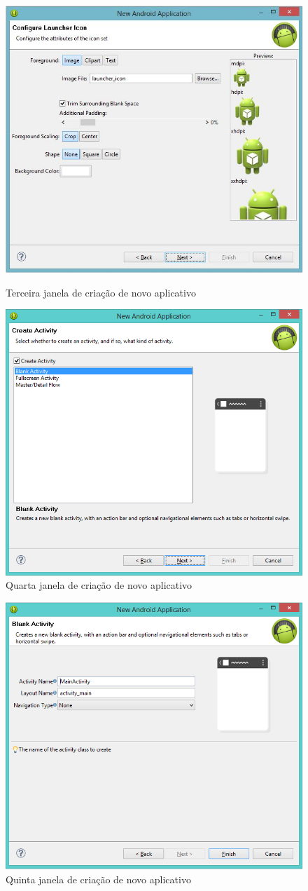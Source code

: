 \documentclass[a4paper,12pt,brazil]{book}
\begin{document}
\begin{figure}[H]
  \centering
  \includegraphics[width=.8\textwidth]{figuras/2-criando-app.jpg}
  \caption{Terceira janela de criação de novo aplicativo}
  \label{fig:c}
   \includegraphics[width=.8\textwidth]{figuras/2-criando-app-4.png}
  \caption{Quarta janela de criação de novo aplicativo}
  \label{fig:c}
 \end{figure}
 \newpage
\begin{figure}[H]
  \centering
   \includegraphics[width=.8\textwidth]{figuras/2-criando-app-5.png}
  \caption{Quinta janela de criação de novo aplicativo}
  \label{fig:c}
\end{figure}
\end{document}
